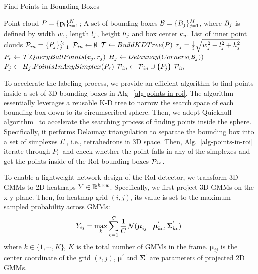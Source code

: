 \begin{algorithm}[t]
\caption{Find Points in Bounding Boxes}
\begin{algorithmic}[1]
\REQUIRE Point cloud ${P} = \{\mathbf{p}_i\}_{i=1}^N$; A set of bounding boxes ${\mathcal{B}} = \{B_j\}_{j=1}^M$, where $B_j$ is defined by width $w_j$, length $l_j$, height $h_j$ and box center $\mathbf{c}_j$.
\ENSURE List of inner point clouds ${\mathbf{\mathcal{P}}}_{in}=\{{P}_j\}_{j=1}^M$
\STATE ${\mathbf{\mathcal{P}}}_{in} \leftarrow \emptyset$
\STATE ${\mathcal{T}} \leftarrow BuildKDTree({P})$
    \STATE $r_j=\frac{1}{2}\sqrt{w_j^2 + l_j^2 + h_j^2 }$
    \STATE ${P}_{r} \leftarrow {\mathcal{T}}.QueryBallPoints(\mathbf{c}_j,r_j)$
    \STATE ${H}_j \leftarrow Delaunay(Corners(B_j))$
    \STATE ${P}_j \leftarrow {H}_j.PointsInAnySimplex({P}_r)$
    \STATE ${\mathbf{\mathcal{P}}}_{in} \gets {\mathbf{\mathcal{P}}}_{in} \cup \{{P}_j\}$
\ENDFOR
\RETURN ${\mathbf{\mathcal{P}}}_{in}$
\end{algorithmic}
\label{alg-points-in-roi}
\end{algorithm}

To accelerate the labeling process, we provide an efficient algorithm to find points inside a set of 3D bounding boxes in Alg.~\ref{alg-points-in-roi}. The algorithm essentially leverages a reusable K-D tree to narrow the search space of each bounding box down to its circumscribed sphere. Then, we adopt Quickhull algorithm~\cite{barber1996quickhull} to accelerate the searching process of finding points inside the sphere. Specifically, it performs Delaunay triangulation to separate the bounding box into a set of simplexes ${H}$, i.e., tetrahedrons in 3D space. Then, Alg.~\ref{alg-points-in-roi} iterate through ${P}_{r}$ and check whether the point falls in any of the simplexes and get the points inside of the RoI bounding boxes ${\mathbf{\mathcal{P}}}_{in}$.

To enable a lightweight network design of the RoI detector, we transform 3D GMMs to 2D heatmaps $Y\in \mathbb{R}^{{h}\times{w}}$. Specifically, we first project 3D GMMs on the x-y plane. Then, for heatmap grid $(i,j)$, its value is set to the maximum sampled probability across GMMs:
\begin{equation}
    {Y}_{ij} = \max_{k} \sum_{c=1}^{C}  \frac{1}{C} \,  \mathcal{N} (\boldsymbol{\mu}_{ij} \mid \boldsymbol{\mu}^{'}_{kc}, \boldsymbol{\Sigma}^{'}_{kc})
\end{equation}
where $k\in\{1,\cdots,K\}$, $K$ is the total number of GMMs in the frame. $\boldsymbol{\mu}_{ij}$ is the center coordinate of the grid $(i,j)$, $\boldsymbol{\mu}^{'}$ and $\boldsymbol{\Sigma}^{'}$ are parameters of projected 2D GMMs. 




